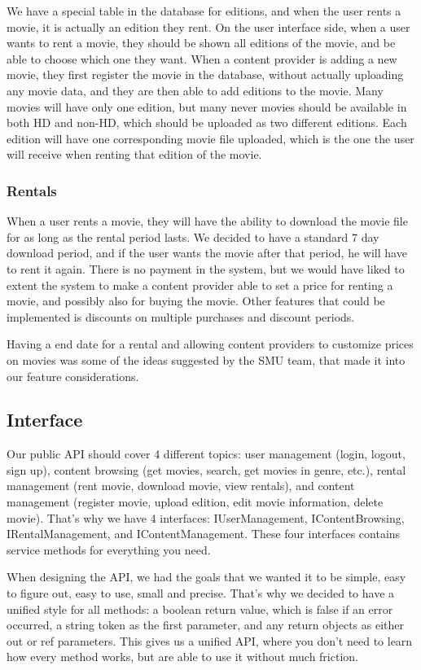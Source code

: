 We have a special table in the database for editions, and when the user rents a movie, it is actually an edition they rent. On the user interface side, when a user wants to rent a movie, they should be shown all editions of the movie, and be able to choose which one they want. When a content provider is adding a new movie, they first register the movie in the database, without actually uploading any movie data, and they are then able to add editions to the movie. Many movies will have only one edition, but many never movies should be available in both HD and non-HD, which should be uploaded as two different editions. Each edition will have one corresponding movie file uploaded, which is the one the user will receive when renting that edition of the movie.

\subsubsection{Rentals}
\label{Design_Service_Analysis_Rentals}
When a user rents a movie, they will have the ability to download the movie file for as long as the rental period lasts. We decided to have a standard 7 day download period, and if the user wants the movie after that period, he will have to rent it again. There is no payment in the system, but we would have liked to extent the system to make a content provider able to set a price for renting a movie, and possibly also for buying the movie. Other features that could be implemented is discounts on multiple purchases and discount periods.

Having a end date for a rental and allowing content providers to customize prices on movies was some of the ideas suggested by the SMU team, that made it into our feature considerations. 

\subsection{Interface}
\label{Design_Service_Interface}
Our public API should cover 4 different topics: user management (login, logout, sign up), content browsing (get movies, search, get movies in genre, etc.), rental management (rent movie, download movie, view rentals), and content management (register movie, upload edition, edit movie information, delete movie). That's why we have 4 interfaces: IUserManagement, IContentBrowsing, IRentalManagement, and IContentManagement. These four interfaces contains service methods for everything you need.

When designing the API, we had the goals that we wanted it to be simple, easy to figure out, easy to use, small and precise. That's why we decided to have a unified style for all methods: a boolean return value, which is false if an error occurred, a string token as the first parameter, and any return objects as either out or ref parameters. This gives us a unified API, where you don't need to learn how every method works, but are able to use it without much friction.

